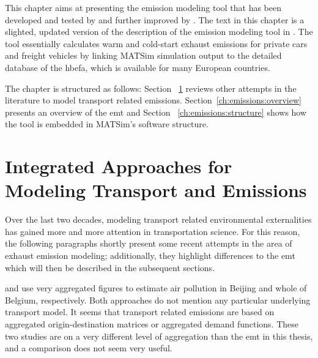 %
{\citet{HuelsmannEtAl_LAS_2011,KickhoeferEtAl_VanoutriveVerhetsel,2013KickhoeferNagel2011MappingEmissions,KickhoeferNagel2013EmissionInternalizationNETS,HuelsmannEtAl2012HotspotPricing,Kickhoefer_PhDThesis_2014,KickhoeferKern2014ExposurePricingMobilTUM}

This chapter aims at presenting the emission modeling tool that has been developed and tested by \citet{HuelsmannEtAl_LAS_2011} and further improved by \citet{KickhoeferEtAl_VanoutriveVerhetsel_2013}. The text in this chapter is a slighted, updated version of the description of the emission modeling tool in \citet{Kickhoefer_PhDThesis_2014}.
%
The tool essentially calculates warm and cold-start exhaust emissions for private cars and freight vehicles by linking MATSim simulation output to the detailed database of the \gls{hbefa}, which is available for many European countries.

The chapter is structured as follows:
%
Section ~\ref{ch:emissions:relatedWork} reviews other attempts in the literature to model transport related emissions. Section~\ref{ch:emissions:overview} presents an overview of the \gls{emt} and Section ~\ref{ch:emissions:structure} shows how the tool is embedded in MATSim's software structure.

\section{Integrated Approaches for Modeling Transport and Emissions}
\label{ch:emissions:relatedWork}
%
%
Over the last two decades, modeling transport related environmental 
externalities has gained more and more attention in transportation science.
%
For this reason, the following paragraphs shortly present some recent 
attempts in the area of exhaust emission modeling; additionally, they 
highlight differences to the \gls{emt} which will then be described in the 
subsequent sections.

\citet{CreutzigHe_TransResD_2009} and 
\citet{MichielsEtAl_TransResD_2012} use very 
aggregated figures to estimate air pollution in Beijing and whole of Belgium, 
respectively. Both approaches do not mention any particular underlying 
transport model. It seems that transport related emissions are based on
aggregated origin-destination matrices or aggregated demand functions. These 
two studies are on a very different level of aggregation than the \gls{emt} in 
this thesis, and a comparison does not seem very useful.

}
